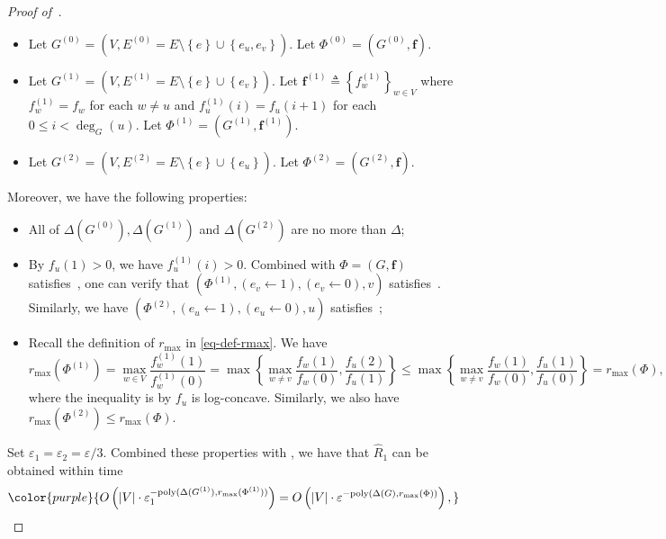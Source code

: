 \documentclass[11pt]{article}
\newcommand{\abs}[1]{\left\vert#1\right\vert}
\newcommand{\set}[1]{\left\{#1\right\}}
\def\poly{\mathrm{poly}}
\newcommand{\wh}[1]{\widehat{#1}}
\newcommand{\vecf}{\boldsymbol{f}}
\newcommand{\qgl}[1]{{\color{purple}{#1}}}
\begin{document}
\begin{proof}[Proof of~]
    \begin{itemize}
    \item Let $G^{(0)} = \left(V, E^{(0)} = E \setminus \set{e} \cup \set{e_u, e_v}\right)$. Let $\Phi^{(0)} = \left(G^{(0)}, \vecf\right)$.
    \item Let $G^{(1)} = \left(V, E^{(1)} = E \setminus \set{e} \cup \set{e_v}\right)$. Let $\vecf^{(1)} \triangleq \set{f_w^{(1)}}_{w \in V}$ where $f_w^{(1)} = f_w$ for each $w \neq u$ and $f_u^{(1)}(i) = f_u(i + 1)$ for each $0 \le i < \deg_G(u)$. Let $\Phi^{(1)} = \left(G^{(1)}, \vecf^{(1)}\right)$.
    \item Let $G^{(2)} = \left(V, E^{(2)} = E \setminus \set{e} \cup \set{e_u}\right)$. Let $\Phi^{(2)} = \left(G^{(2)}, \vecf\right)$.
    \end{itemize}
    Moreover, we have the following properties:
    \begin{itemize}
    \item All of $\Delta\left(G^{(0)}\right), \Delta\left(G^{(1)}\right)$ and $\Delta\left(G^{(2)}\right)$ are no more than $\Delta$;
    \item By $f_u(1)>0$, we have $f_u^{(1)}(i) >0$. Combined with  $\Phi = (G,\vecf)$ satisfies~, one can verify that $\left(\Phi^{(1)},(e_v\leftarrow 1),(e_v\leftarrow 0),v\right)$ satisfies~.
    Similarly, we have $\left(\Phi^{(2)},(e_u\leftarrow 1),(e_u\leftarrow 0),u\right)$ satisfies~;
    \item Recall the definition of $r_{\max}$ in \eqref{eq-def-rmax}. We have 
    \[r_{\max}(\Phi^{(1)}) = \max_{w \in V} \frac{f^{(1)}_w(1)}{f^{(1)}_w(0)} = \max\left\{\max_{w\neq v} \frac{f_w(1)}{f_w(0)},\frac{f_u(2)}{f_u(1)}\right\} \leq \max\left\{\max_{w\neq v} \frac{f_w(1)}{f_w(0)},\frac{f_u(1)}{f_u(0)}\right\} = r_{\max}(\Phi),\]
    where the inequality is by $f_u$ is log-concave.
    Similarly, we also have $r_{\max}(\Phi^{(2)}) \le r_{\max}(\Phi)$. 
    \end{itemize}
    Set $\varepsilon_1 = \varepsilon_2 = \varepsilon/3$.
    Combined these properties with , we have that $\wh{R}_1$ can be obtained within time 
    \[\qgl{O\left(\abs{V} \cdot \varepsilon_1^{-\poly(\Delta(G^{(1)}),r_{\max}(\Phi^{(1)}))}\right) = O\left(\abs{V} \cdot \varepsilon^{-\poly(\Delta(G),r_{\max}(\Phi))}\right),}\]

\end{proof}
\end{document}

